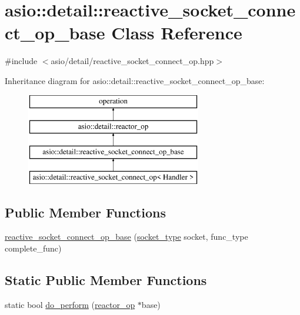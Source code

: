 \hypertarget{classasio_1_1detail_1_1reactive__socket__connect__op__base}{}\section{asio\+:\+:detail\+:\+:reactive\+\_\+socket\+\_\+connect\+\_\+op\+\_\+base Class Reference}
\label{classasio_1_1detail_1_1reactive__socket__connect__op__base}


{\ttfamily \#include $<$asio/detail/reactive\+\_\+socket\+\_\+connect\+\_\+op.\+hpp$>$}

Inheritance diagram for asio\+:\+:detail\+:\+:reactive\+\_\+socket\+\_\+connect\+\_\+op\+\_\+base\+:\begin{figure}[H]
\begin{center}
\leavevmode
\includegraphics[height=4.000000cm]{classasio_1_1detail_1_1reactive__socket__connect__op__base}
\end{center}
\end{figure}
\subsection*{Public Member Functions}
\begin{DoxyCompactItemize}
\item 
\hyperlink{classasio_1_1detail_1_1reactive__socket__connect__op__base_a0ceaaa674442426225725aa588f3f519}{reactive\+\_\+socket\+\_\+connect\+\_\+op\+\_\+base} (\hyperlink{namespaceasio_1_1detail_a6798c771dd84b79798b1a08150706ea9}{socket\+\_\+type} socket, func\+\_\+type complete\+\_\+func)
\end{DoxyCompactItemize}
\subsection*{Static Public Member Functions}
\begin{DoxyCompactItemize}
\item 
static bool \hyperlink{classasio_1_1detail_1_1reactive__socket__connect__op__base_ab812aa9b3569968bfe5361d7a1fbd9ae}{do\+\_\+perform} (\hyperlink{classasio_1_1detail_1_1reactor__op}{reactor\+\_\+op} $\ast$base)
\end{DoxyCompactItemize}
